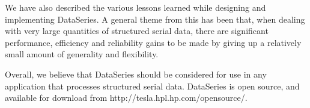 \documentclass{acm_proc_article-sp}
\begin{document}
We have also described the various lessons learned while designing and
implementing DataSeries. A general theme from this has been that, when
dealing with very large quantities of structured serial data, 
there are significant performance, efficiency and reliability gains to be made
by giving up a relatively small amount of generality and flexibility. 

Overall, we believe that DataSeries should be considered for use in
any application that processes structured serial data. DataSeries is
open source, and available for download from
http://tesla.hpl.hp.com/opensource/.


{\small

}
%
%
\balancecolumns
\end{document}
